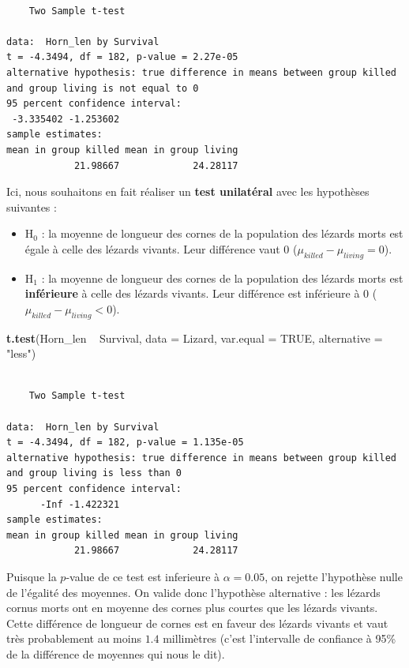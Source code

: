 \documentclass[
  a4paper,
]{article}
\newenvironment{Shaded}{\begin{snugshade}}{\end{snugshade}}
\newcommand{\DataTypeTok}[1]{\textcolor[rgb]{0.00,0.34,0.68}{#1}}
\newcommand{\KeywordTok}[1]{\textcolor[rgb]{0.12,0.11,0.11}{\textbf{#1}}}
\newcommand{\NormalTok}[1]{\textcolor[rgb]{0.12,0.11,0.11}{#1}}
\newcommand{\OperatorTok}[1]{\textcolor[rgb]{0.12,0.11,0.11}{#1}}
\newcommand{\OtherTok}[1]{\textcolor[rgb]{0.00,0.43,0.16}{#1}}
\newcommand{\StringTok}[1]{\textcolor[rgb]{0.75,0.01,0.01}{#1}}
\providecommand{\tightlist}{%
  \setlength{\itemsep}{0pt}\setlength{\parskip}{0pt}}
\begin{document}
\begin{verbatim}

    Two Sample t-test

data:  Horn_len by Survival
t = -4.3494, df = 182, p-value = 2.27e-05
alternative hypothesis: true difference in means between group killed and group living is not equal to 0
95 percent confidence interval:
 -3.335402 -1.253602
sample estimates:
mean in group killed mean in group living 
            21.98667             24.28117 
\end{verbatim}

Ici, nous souhaitons en fait réaliser un \textbf{test unilatéral} avec les hypothèses suivantes :

\begin{itemize}
\tightlist
\item
  H\(_0\) : la moyenne de longueur des cornes de la population des lézards morts est égale à celle des lézards vivants. Leur différence vaut 0 (\(\mu_{killed}-\mu_{living} = 0\)).
\item
  H\(_1\) : la moyenne de longueur des cornes de la population des lézards morts est \textbf{inférieure} à celle des lézards vivants. Leur différence est inférieure à 0 (\(\mu_{killed}-\mu_{living} < 0\)).
\end{itemize}

\begin{Shaded}
\begin{Highlighting}[]
\KeywordTok{t.test}\NormalTok{(Horn_len }\OperatorTok{~}\StringTok{ }\NormalTok{Survival, }
       \DataTypeTok{data =}\NormalTok{ Lizard, }\DataTypeTok{var.equal =} \OtherTok{TRUE}\NormalTok{,}
       \DataTypeTok{alternative =} \StringTok{"less"}\NormalTok{)}
\end{Highlighting}
\end{Shaded}

\begin{verbatim}

    Two Sample t-test

data:  Horn_len by Survival
t = -4.3494, df = 182, p-value = 1.135e-05
alternative hypothesis: true difference in means between group killed and group living is less than 0
95 percent confidence interval:
      -Inf -1.422321
sample estimates:
mean in group killed mean in group living 
            21.98667             24.28117 
\end{verbatim}

Puisque la \(p\)-value de ce test est inferieure à \(\alpha = 0.05\), on rejette l'hypothèse nulle de l'égalité des moyennes. On valide donc l'hypothèse alternative : les lézards cornus morts ont en moyenne des cornes plus courtes que les lézards vivants. Cette différence de longueur de cornes est en faveur des lézards vivants et vaut très probablement au moins \(1.4\) millimètres (c'est l'intervalle de confiance à 95\% de la différence de moyennes qui nous le dit).
\end{document}
